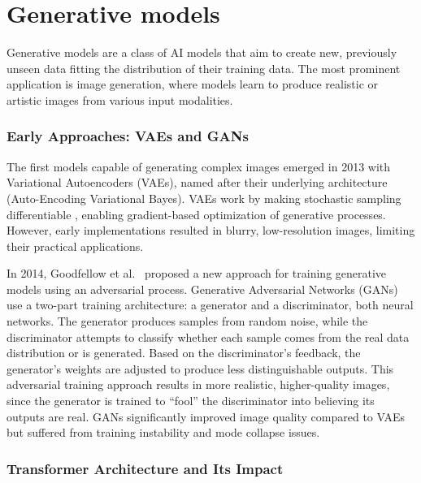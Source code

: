 \documentclass[
  a4paper,  %
  twoside,  %
  bibliography=totoc,
  headsepline,
  cleardoublepage=empty,
  parskip=half,
  draft=false
]{scrbook}
\begin{document}
\section{Generative models}




Generative models are a class of AI models that aim to create new, previously unseen data fitting the distribution of their training data. The most prominent application is image generation, where models learn to produce realistic or artistic images from various input modalities.

\subsubsection{Early Approaches: VAEs and GANs}

The first models capable of generating complex images emerged in 2013 with Variational Autoencoders (VAEs), named after their underlying architecture (Auto-Encoding Variational Bayes). VAEs work by making stochastic sampling differentiable \cite{kingma2022autoencodingvariationalbayes}, enabling gradient-based optimization of generative processes. However, early implementations resulted in blurry, low-resolution images, limiting their practical applications.

In 2014, Goodfellow et al.\ \cite{goodfellow2014generativeadversarialnetworks} proposed a new approach for training generative models using an adversarial process. Generative Adversarial Networks (GANs) use a two-part training architecture: a generator and a discriminator, both neural networks. The generator produces samples from random noise, while the discriminator attempts to classify whether each sample comes from the real data distribution or is generated. Based on the discriminator's feedback, the generator's weights are adjusted to produce less distinguishable outputs. This adversarial training approach results in more realistic, higher-quality images, since the generator is trained to ``fool'' the discriminator into believing its outputs are real. GANs significantly improved image quality compared to VAEs but suffered from training instability and mode collapse issues.

\subsubsection{Transformer Architecture and Its Impact}
\end{document}
